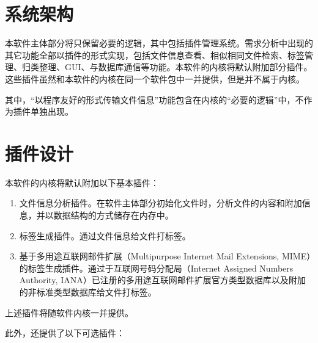 \section{系统架构}

本软件主体部分将只保留必要的逻辑，其中包括插件管理系统。需求分析中出现的其它功能全部以插件的形式实现，包括文件信息查看、相似相同文件检索、标签管理、归类整理、GUI、与数据库通信等功能。本软件的内核将默认附加部分插件。这些插件虽然和本软件的内核在同一个软件包中一并提供，但是并不属于内核。

其中，“以程序友好的形式传输文件信息”功能包含在内核的“必要的逻辑”中，不作为插件单独出现。

\section{插件设计}

本软件的内核将默认附加以下基本插件：

\begin{enumerate}
    \item 文件信息分析插件。在软件主体部分初始化文件时，分析文件的内容和附加信息，并以数据结构的方式储存在内存中。
    \item 标签生成插件。通过文件信息给文件打标签。
    \item 基于多用途互联网邮件扩展（Multipurpose Internet Mail Extensions, MIME）的标签生成插件。通过于互联网号码分配局（Internet Assigned Numbers Authority, IANA）已注册的多用途互联网邮件扩展官方类型数据库以及附加的非标准类型数据库给文件打标签。
\end{enumerate}

上述插件将随软件内核一并提供。

此外，还提供了以下可选插件：


